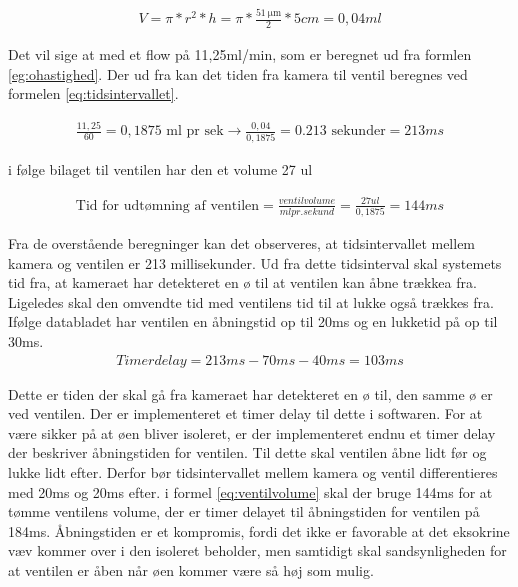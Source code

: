 \begin{align}
V=\pi*r^2*h=\pi*\frac{\SI{51}{\micro\metre}}{2}*5cm=0,04ml
\label{eg:slangevolume}
\end{align}

 Det vil sige at med et flow på 11,25ml/min, som er beregnet ud fra formlen \ref{eg:ohastighed}. Der ud fra kan det tiden fra kamera til ventil beregnes ved formelen \ref{eq:tidsintervallet}. 
 
\begin{align}
\frac{11,25}{60}=0,1875\text{ ml pr sek}\to\frac{0,04}{0,1875}=0.213\text{ sekunder}=213ms
\label{eq:tidsintervallet}
\end{align} 

i følge bilaget til ventilen har den et volume 27 ul

\begin{align}
\text{Tid for udtømning af ventilen} = \frac{ventil volume}{ml pr. sekund}=\frac{27ul}{0,1875}=144ms
\label{eq:ventilvolume}
\end{align}

Fra de overstående beregninger kan det observeres, at tidsintervallet mellem kamera og ventilen er 213 millisekunder. Ud fra dette tidsinterval skal systemets tid fra, at kameraet har detekteret en ø til at ventilen kan åbne trækkea fra. Ligeledes skal den omvendte tid med ventilens tid til at lukke også trækkes fra. Ifølge databladet har ventilen en åbningstid op til 20ms og en lukketid på op til 30ms.
\begin{align}
Timerdelay=213ms-70ms-40ms=103ms
\label{eq:timerdelay}
\end{align} 

Dette er tiden der skal gå fra kameraet har detekteret en ø til, den samme ø er ved ventilen. Der er implementeret et timer delay til dette i softwaren. For at være sikker på at øen bliver isoleret, er der implementeret endnu et timer delay der beskriver åbningstiden for ventilen. Til dette skal ventilen åbne lidt før og lukke lidt efter. Derfor bør tidsintervallet mellem kamera og ventil differentieres med 20ms og 20ms efter. i formel \ref{eq:ventilvolume} skal der bruge 144ms for at tømme ventilens volume, der er timer delayet til åbningstiden for ventilen på 184ms. 
Åbningstiden er et kompromis, fordi det ikke er favorable at det eksokrine væv kommer over i den isoleret beholder, men samtidigt skal sandsynligheden for at ventilen er åben når øen kommer være så høj som mulig.

